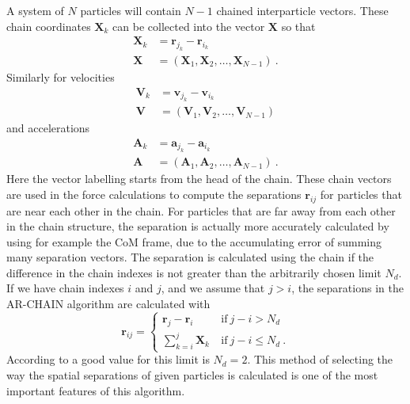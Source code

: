 \documentclass[english, oneside]{HYgradu}
\begin{document}
A system of $N$ particles will contain $N-1$ chained interparticle vectors. These chain coordinates $\boldsymbol{X}_k$ can be collected into the vector $\boldsymbol{X}$ so that
\begin{equation}
\begin{aligned}
\boldsymbol{X}_k &= \boldsymbol{r}_{j_k} - \boldsymbol{r}_{i_k} \\
\boldsymbol{X} &= (\boldsymbol{X}_1, \boldsymbol{X}_2, \ldots, \boldsymbol{X}_{N-1}) \ .
\end{aligned}
\end{equation}
Similarly for velocities
\begin{equation}
\begin{aligned}
\boldsymbol{V}_k &= \boldsymbol{v}_{j_k} - \boldsymbol{v}_{i_k} \\
\boldsymbol{V} &= (\boldsymbol{V}_1, \boldsymbol{V}_2, \ldots, \boldsymbol{V}_{N-1})
\end{aligned}
\end{equation}
and accelerations
\begin{equation}
\begin{aligned}
\boldsymbol{A}_k &= \boldsymbol{a}_{j_k} - \boldsymbol{a}_{i_k} \\
\boldsymbol{A} &= (\boldsymbol{A}_1, \boldsymbol{A}_2, \ldots, \boldsymbol{A}_{N-1}) \ .
\end{aligned}
\end{equation}
Here the vector labelling starts from the head of the chain. These chain vectors are used in the force calculations to compute the separations $\boldsymbol{r}_{ij}$ for particles that are near each other in the chain. For particles that are far away from each other in the chain structure, the separation is actually more accurately calculated by using for example the CoM frame, due to the accumulating error of summing many separation vectors. The separation is calculated using the chain if the difference in the chain indexes is not greater than the arbitrarily chosen limit $N_d$. If we have chain indexes $i$ and $j$, and we assume that $j > i$, the separations in the AR-CHAIN algorithm are calculated with
\begin{equation}
\boldsymbol{r}_{ij} =
\begin{cases}
\boldsymbol{r}_j - \boldsymbol{r}_i \ &\mathrm{if} \ j-i > N_d \\
\sum_{k=i}^j \boldsymbol{X}_k \ &\mathrm{if} \ j-i \leq N_d \ .
\end{cases}
\end{equation}
According to \cite{mikkola:2008b} a good value for this limit is $N_d = 2$. This method of selecting the way the spatial separations of given particles is calculated is one of the most important features of this algorithm.
\end{document}
